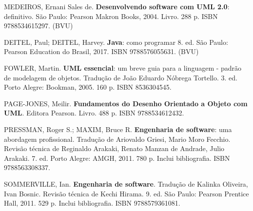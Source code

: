 \begin{pud}
\begin{bibbasica}
		\item MEDEIROS, Ernani Sales de. \textbf{Desenvolvendo software com UML 2.0}: definitivo. São Paulo:  Pearson Makron Books, 2004. Livro. 288 p. ISBN 9788534615297. (BVU)
	\end{bibbasica}
	
	\begin{bibcomplementar}
    
 		\item DEITEL, Paul; DEITEL, Harvey. \textbf{Java}: como programar 8. ed. São Paulo: Pearson Education do Brasil, 2017. ISBN 9788576055631. (BVU)
		\item FOWLER, Martin. \textbf{UML essencial}: um breve guia para a linguagem - padrão de modelagem de objetos. Tradução de João Eduardo Nóbrega Tortello. 3. ed. Porto Alegre: Bookman, 2005. 160 p. ISBN 8536304545.
		\item PAGE-JONES, Meilir. \textbf{Fundamentos do Desenho Orientado a Objeto com UML}. Editora Pearson. Livro. 488 p. ISBN 9788534612432. 
		\item PRESSMAN, Roger S.; MAXIM, Bruce R. \textbf{Engenharia de software}: uma abordagem profissional. Tradução de Ariovaldo Griesi, Mario Moro Fecchio. Revisão técnica de Reginaldo Arakaki, Renato Manzan de Andrade, Julio Arakaki. 7. ed. Porto Alegre: AMGH, 2011. 780 p. Inclui bibliografia. ISBN 9788563308337.				 
		
		\item SOMMERVILLE, Ian. \textbf{Engenharia de software}. Tradução de Kalinka Oliveira, Ivan Bosnic. Revisão técnica de Kechi Hirama. 9. ed. São Paulo: Pearson Prentice Hall, 2011. 529 p. Inclui bibliografia. ISBN 9788579361081.	
		
		
	\end{bibcomplementar}
	
	
    	
	
\end{pud}



